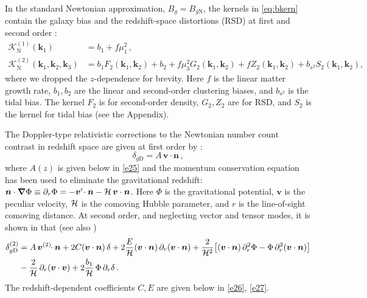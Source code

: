 In the standard Newtonian approximation, $B_g=B_{g{\mathrm{N}}}$, the kernels in \eqref{eq:bkern} contain the galaxy bias and the redshift-space distortions (RSD) at first and second order \cite{Bernardeau:2001qr, Karagiannis:2018jdt}:
\begin{align}
\mathcal{K}^{(1)}_{\mathrm{N}}(\bm{k}_{1}) &= b_{1}+f\mu_{1}^{2}\,,  \label{e15} \\ 
{\mathcal{K}^{(2)}_{\mathrm{N}}}(\bm{k}_{1}, \bm{k}_{2},{\bm{k}_3}) &= b_{1}F_{2}(\bm{k}_{1}, \bm{k}_{2}) + b_{2} + f\mu_{3}^{2}G_{2}(\bm{k}_{1}, \bm{k}_{2}) +{fZ_2}(\bm{k}_{1}, \bm{k}_{2})
+ b_{s^{2}}S_{2}(\bm{k}_{1}, \bm{k}_{2}) , \label{k2n}
\end{align}
where we dropped the $z$-dependence for brevity. Here $f$ is the linear matter growth rate, $b_1,b_2$ are the linear and second-order clustering biases, and $b_{s^{2}}$ is the tidal bias. The kernel  $F_2$ is for second-order density, $G_2 , Z_2$ are for RSD,  and $S_2$  is the kernel for tidal bias {(see the Appendix)}.


The Doppler-type relativistic corrections to the Newtonian number count contrast in redshift space are  given {at first order by \cite{Bonvin:2011bg}:}
\begin{equation}
\delta_{g\mathrm{D}} =  {A}\,\bm{v}\cdot\bm{n}\,,\label{dg1}
\end{equation}
{where $A(z)$ is given below in \eqref{e25} and the momentum conservation equation has been used to  eliminate the gravitational redshift: $\bm{n}\cdot\bm{\nabla}\Phi\equiv \partial_r \Phi = -\bm{v}'\!\cdot\bm{n}-\mathcal{H}\,\bm{v}\cdot\bm{n} $.} Here $\Phi$ is the gravitational potential, $\bm{v}$ is the peculiar velocity,  $\mathcal{H}$ is the comoving Hubble parameter, and $r$ is the line-of-sight comoving distance.
At second order, and neglecting vector and tensor modes, it is shown in
\cite{Clarkson:2018dwn}  that (see also \cite{DiDio:2018zmk}) 
\begin{align}
\delta^{(2)}_{g{\mathrm{D}}}&= A\, \bm{v}^{(2)}\!\!\cdot\bm{n}+2{C}(\bm{v}\cdot\bm{n})\,\delta +2 \frac{{E}}{\mathcal{H}}(\bm{v}\cdot\bm{n})\,\partial_r(\bm{v}\cdot\bm{n})
+ \frac{2}{\mathcal{H}^2}\big[(\bm{v}\cdot\bm{n}) \,\partial_r^2\Phi-\Phi\, \partial_r^2 (\bm{v}\cdot\bm{n}) \big]
\nonumber\\ \label{eq:dgsecond}
& - \frac{2}{\mathcal{H}}\,\partial_r (\bm{v}\cdot\bm{v}) + 2 \frac{b_1}{\mathcal{H}}\,\Phi\, \partial_r\delta \,. 
\end{align}
The redshift-dependent coefficients $C,E$ are  given below  in \eqref{e26}, \eqref{e27}.


